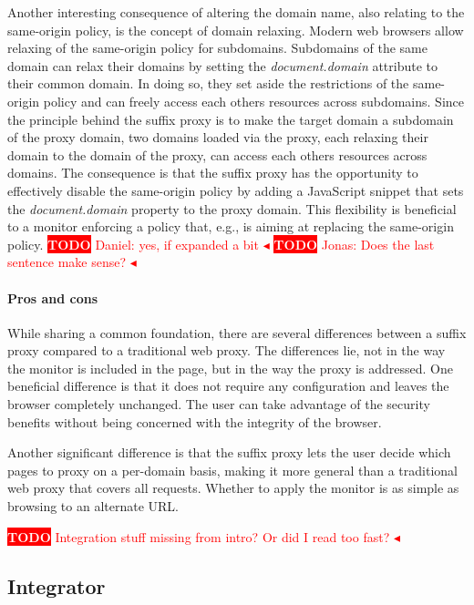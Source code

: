 \documentclass{llncs}
\newcommand{\todo}[1]{\colorbox{red}{\textcolor{white}{\sffamily\bfseries\scriptsize TODO}} \textcolor{red}{#1} \textcolor{red}{$\blacktriangleleft$}}
\begin{document}
Another interesting consequence of altering the domain name, also relating to 
the same-origin policy, is the concept of domain relaxing. Modern web browsers 
allow relaxing of the same-origin policy for subdomains. Subdomains of the same 
domain can relax their domains by setting the \emph{document.domain} attribute
to their common domain. In doing so, they set aside the restrictions of the 
same-origin policy and can freely access each others resources across subdomains. 
Since the principle behind the suffix proxy is to make the target domain a subdomain of the proxy domain, two 
domains loaded via the proxy, each relaxing their domain to the domain of the 
proxy, can access each others resources across domains.
The consequence is that the suffix proxy has the opportunity to effectively disable the same-origin 
policy by adding a JavaScript snippet that sets the \emph{document.domain} property
to the proxy domain. This flexibility is beneficial to a monitor enforcing a policy that, e.g., is aiming 
at replacing the same-origin policy.
\todo{Daniel: yes, if expanded a bit}
\todo{Jonas: Does the last sentence make sense?}



\paragraph{Pros and cons}

While sharing a common foundation, there are several differences between a 
suffix proxy compared to a traditional web proxy. The differences lie, not in 
the way the monitor is included in the page, but in the way the proxy is 
addressed. One beneficial difference is that it does not require any 
configuration and leaves the browser completely unchanged. The user can take
advantage of the security benefits without being concerned with the integrity 
of the browser.

Another significant difference is that the suffix proxy lets the user decide which pages to proxy on a 
per-domain basis, making it more general than a traditional web proxy that covers 
all requests. %
Whether to apply the monitor is as simple as browsing to an alternate URL.


\todo{Integration stuff missing from intro? Or did I read too fast?}
\subsection{Integrator}
\end{document}
